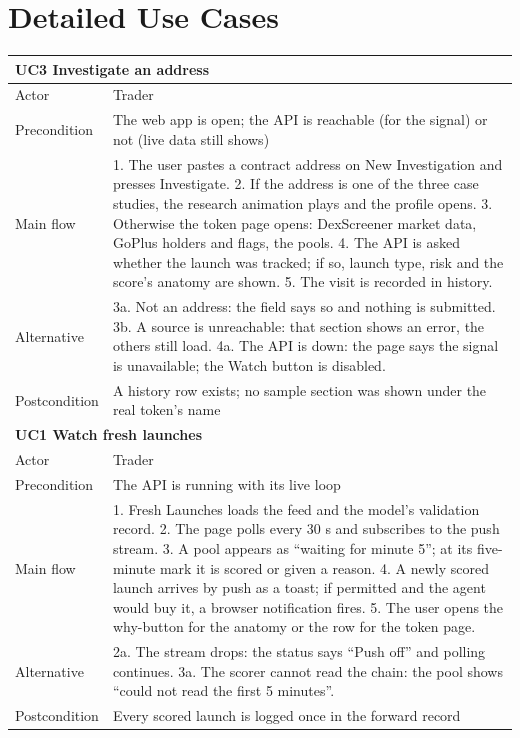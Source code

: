 \section{Detailed Use Cases}
\begin{table}[H]
\centering\small
\begin{tabular}{p{}p{}}
\toprule
\multicolumn{2}{l}{\textbf{UC3 Investigate an address}}\\
\midrule
Actor & Trader\\
Precondition & The web app is open; the API is reachable (for the signal) or not (live data still shows)\\
Main flow & 1. The user pastes a contract address on New Investigation and presses Investigate. 2. If the address is one of the three case studies, the research animation plays and the profile opens. 3. Otherwise the token page opens: DexScreener market data, GoPlus holders and flags, the pools. 4. The API is asked whether the launch was tracked; if so, launch type, risk and the score's anatomy are shown. 5. The visit is recorded in history.\\
Alternative & 3a. Not an address: the field says so and nothing is submitted. 3b. A source is unreachable: that section shows an error, the others still load. 4a. The API is down: the page says the signal is unavailable; the Watch button is disabled.\\
Postcondition & A history row exists; no sample section was shown under the real token's name\\
\midrule
\multicolumn{2}{l}{\textbf{UC1 Watch fresh launches}}\\
\midrule
Actor & Trader\\
Precondition & The API is running with its live loop\\
Main flow & 1. Fresh Launches loads the feed and the model's validation record. 2. The page polls every 30 s and subscribes to the push stream. 3. A pool appears as ``waiting for minute 5''; at its five-minute mark it is scored or given a reason. 4. A newly scored launch arrives by push as a toast; if permitted and the agent would buy it, a browser notification fires. 5. The user opens the why-button for the anatomy or the row for the token page.\\
Alternative & 2a. The stream drops: the status says ``Push off'' and polling continues. 3a. The scorer cannot read the chain: the pool shows ``could not read the first 5 minutes''.\\
Postcondition & Every scored launch is logged once in the forward record\\

\end{tabular}
\end{table}
